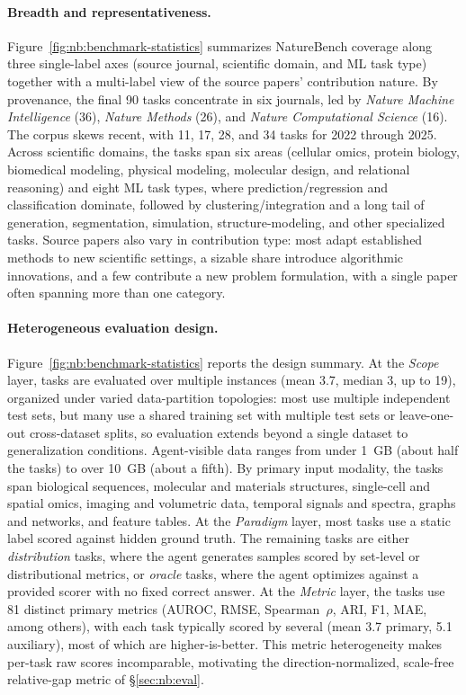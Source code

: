 \paragraph{Breadth and representativeness.}
Figure~\ref{fig:nb:benchmark-statistics} summarizes NatureBench coverage along three single-label axes (source journal, scientific domain, and ML task type) together with a multi-label view of the source papers' contribution nature.
By provenance, the final 90 tasks concentrate in six journals, led by \emph{Nature Machine Intelligence} (36), \emph{Nature Methods} (26), and \emph{Nature Computational Science} (16). The corpus skews recent, with 11, 17, 28, and 34 tasks for 2022 through 2025.
Across scientific domains, the tasks span six areas (cellular omics, protein biology, biomedical modeling, physical modeling, molecular design, and relational reasoning) and eight ML task types, where prediction/regression and classification dominate, followed by clustering/integration and a long tail of generation, segmentation, simulation, structure-modeling, and other specialized tasks.
Source papers also vary in contribution type: most adapt established methods to new scientific settings, a sizable share introduce algorithmic innovations, and a few contribute a new problem formulation, with a single paper often spanning more than one category.
\paragraph{Heterogeneous evaluation design.}
Figure~\ref{fig:nb:benchmark-statistics} reports the design summary.
At the \emph{Scope} layer, tasks are evaluated over multiple instances (mean 3.7, median 3, up to 19), organized under varied data-partition topologies: most use multiple independent test sets, but many use a shared training set with multiple test sets or leave-one-out cross-dataset splits, so evaluation extends beyond a single dataset to generalization conditions.
Agent-visible data ranges from under 1~GB (about half the tasks) to over 10~GB (about a fifth).
By primary input modality, the tasks span biological sequences, molecular and materials structures, single-cell and spatial omics, imaging and volumetric data, temporal signals and spectra, graphs and networks, and feature tables.
At the \emph{Paradigm} layer, most tasks use a static label scored against hidden ground truth. The remaining tasks are either \emph{distribution} tasks, where the agent generates samples scored by set-level or distributional metrics, or \emph{oracle} tasks, where the agent optimizes against a provided scorer with no fixed correct answer.
At the \emph{Metric} layer, the tasks use 81 distinct primary metrics (AUROC, RMSE, Spearman~$\rho$, ARI, F1, MAE, among others), with each task typically scored by several (mean 3.7 primary, 5.1 auxiliary), most of which are higher-is-better.
This metric heterogeneity makes per-task raw scores incomparable, motivating the direction-normalized, scale-free relative-gap metric of \S\ref{sec:nb:eval}.


